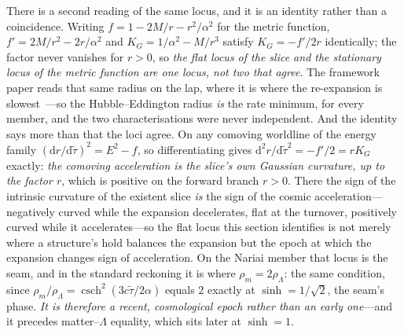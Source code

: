 \documentclass[11pt,a4paper]{article}
\theoremstyle{definition}
\begin{document}
There is a second reading of the same locus, and it is an identity rather than a coincidence. Writing $f=1-2M/r-r^{2}/\alpha^{2}$ for the metric function, $f'=2M/r^{2}-2r/\alpha^{2}$ and $K_{G}=1/\alpha^{2}-M/r^{3}$ satisfy $K_{G}=-f'/2r$ identically; the factor never vanishes for $r>0$, so \emph{the flat locus of the slice and the stationary locus of the metric function are one locus, not two that agree}. The framework paper reads that same radius on the lap, where it is where the re-expansion is slowest~\cite{JanzenCRframework}---so the Hubble--Eddington radius \emph{is} the rate minimum, for every member, and the two characterisations were never independent. And the identity says more than that the loci agree. On any comoving worldline of the energy family $(\mathrm{d}r/\mathrm{d}\tilde\tau)^{2}=E^{2}-f$, so differentiating gives $\mathrm{d}^{2}r/\mathrm{d}\tilde\tau^{2}=-f'/2=rK_{G}$ exactly: \emph{the comoving acceleration is the slice's own Gaussian curvature, up to the factor $r$}, which is positive on the forward branch $r>0$. There the sign of the intrinsic curvature of the existent slice \emph{is} the sign of the cosmic acceleration---negatively curved while the expansion decelerates, flat at the turnover, positively curved while it accelerates---so the flat locus this section identifies is not merely where a structure's hold balances the expansion but the epoch at which the expansion changes sign of acceleration. On the Nariai member that locus is the seam, and in the standard reckoning it is where $\rho_{m}=2\rho_{\Lambda}$: the same condition, since $\rho_{m}/\rho_{\Lambda}=\operatorname{csch}^{2}(3c\tilde\tau/2\alpha)$ equals $2$ exactly at $\sinh=1/\sqrt2$, the seam's phase. \emph{It is therefore a recent, cosmological epoch rather than an early one}---and it precedes matter--$\Lambda$ equality, which sits later at $\sinh=1$.
\end{document}
